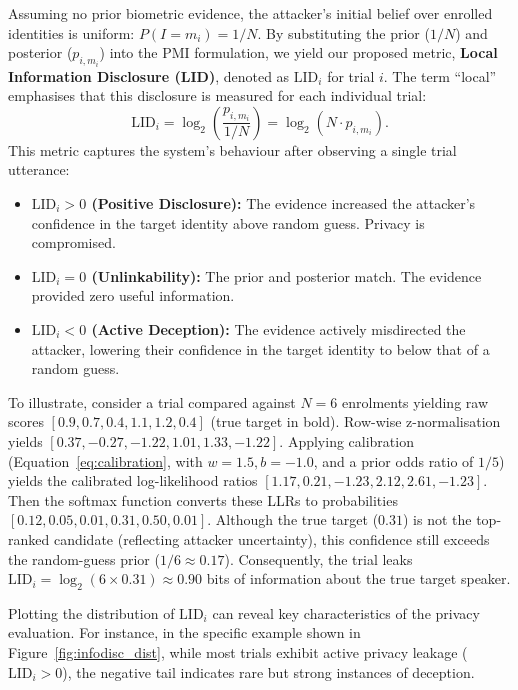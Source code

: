 Assuming no prior biometric evidence, the attacker's initial belief over enrolled identities is uniform: $P(I=m_i) = 1/N$.
By substituting the prior ($1/N$) and posterior ($p_{i, m_i}$) into the PMI formulation, we yield our proposed metric, \textbf{Local Information Disclosure (LID)}, denoted as $\mathrm{LID}_i$ for trial $i$. The term ``local'' emphasises that this disclosure is measured for each individual trial:
\begin{equation}
    \mathrm{LID}_i = \log_2 \left( \frac{p_{i, m_i}}{1/N} \right) = \log_2(N \cdot p_{i, m_i}).
\end{equation}
This metric captures the system's behaviour after observing a single trial utterance:
\begin{itemize}
    \item \textbf{$\mathrm{LID}_i > 0$ (Positive Disclosure):} The evidence increased the attacker's confidence in the target identity above random guess. Privacy is compromised.
    \item \textbf{$\mathrm{LID}_i = 0$ (Unlinkability):} The prior and posterior match. The evidence provided zero useful information.
    \item \textbf{$\mathrm{LID}_i < 0$ (Active Deception):} The evidence actively misdirected the attacker, lowering their confidence in the target identity to below that of a random guess.
\end{itemize}

To illustrate, consider a trial compared against $N=6$ enrolments yielding raw scores $[0.9, 0.7, 0.4, \mathbf{1.1}, 1.2, 0.4]$ (true target in bold). Row-wise z-normalisation yields $[0.37, -0.27, -1.22, \mathbf{1.01}, 1.33, -1.22]$. Applying calibration (Equation~\ref{eq:calibration}, with $w=1.5, b=-1.0$, and a prior odds ratio of $1/5$) yields the calibrated log-likelihood ratios $[1.17, 0.21, -1.23, \mathbf{2.12}, 2.61, -1.23]$. Then the softmax function converts these LLRs to probabilities $[0.12, 0.05, 0.01, \mathbf{0.31}, 0.50, 0.01]$. Although the true target ($0.31$) is not the top-ranked candidate (reflecting attacker uncertainty), this confidence still exceeds the random-guess prior ($1/6 \approx 0.17$). Consequently, the trial leaks $\mathrm{LID}_i = \log_2(6 \times 0.31) \approx 0.90$ bits of information about the true target speaker.


Plotting the distribution of $\mathrm{LID}_i$ can reveal key characteristics of the privacy evaluation. For instance, in the specific example shown in Figure~\ref{fig:infodisc_dist}, while most trials exhibit active privacy leakage ($\mathrm{LID}_i > 0$), the negative tail indicates rare but strong instances of deception.

